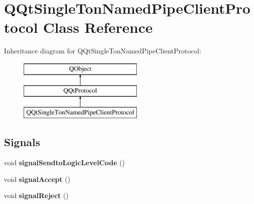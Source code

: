 \hypertarget{class_q_qt_single_ton_named_pipe_client_protocol}{}\section{Q\+Qt\+Single\+Ton\+Named\+Pipe\+Client\+Protocol Class Reference}
\label{class_q_qt_single_ton_named_pipe_client_protocol}
Inheritance diagram for Q\+Qt\+Single\+Ton\+Named\+Pipe\+Client\+Protocol\+:\begin{figure}[H]
\begin{center}
\leavevmode
\includegraphics[height=3.000000cm]{class_q_qt_single_ton_named_pipe_client_protocol}
\end{center}
\end{figure}
\subsection*{Signals}
\begin{DoxyCompactItemize}
\item 
\mbox{\label{class_q_qt_single_ton_named_pipe_client_protocol_aecab516a21a6c58969bf217707d0038c}} 
void {\bfseries signal\+Sendto\+Logic\+Level\+Code} ()
\item 
\mbox{\label{class_q_qt_single_ton_named_pipe_client_protocol_a6226c40d8547144777672a1573a605c7}} 
void {\bfseries signal\+Accept} ()
\item 
\mbox{\label{class_q_qt_single_ton_named_pipe_client_protocol_af4e17a4fc1fcefd9714d3d5022055372}} 
void {\bfseries signal\+Reject} ()
\end{DoxyCompactItemize}
